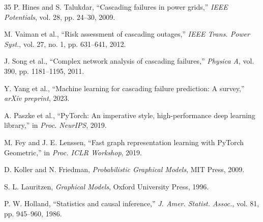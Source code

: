 \documentclass[journal,12pt,onecolumn]{IEEEtran}
\begin{document}
\begin{thebibliography}{35}
P. Hines and S. Talukdar, ``Cascading failures in power grids,'' \emph{IEEE Potentials}, vol. 28, pp. 24--30, 2009.

M. Vaiman et al., ``Risk assessment of cascading outages,'' \emph{IEEE Trans. Power Syst.}, vol. 27, no. 1, pp. 631--641, 2012.

J. Song et al., ``Complex network analysis of cascading failures,'' \emph{Physica A}, vol. 390, pp. 1181--1195, 2011.

Y. Yang et al., ``Machine learning for cascading failure prediction: A survey,'' \emph{arXiv preprint}, 2023.

A. Paszke et al., ``PyTorch: An imperative style, high-performance deep learning library,'' in \emph{Proc. NeurIPS}, 2019.

M. Fey and J. E. Lenssen, ``Fast graph representation learning with PyTorch Geometric,'' in \emph{Proc. ICLR Workshop}, 2019.

D. Koller and N. Friedman, \emph{Probabilistic Graphical Models}, MIT Press, 2009.

S. L. Lauritzen, \emph{Graphical Models}, Oxford University Press, 1996.

P. W. Holland, ``Statistics and causal inference,'' \emph{J. Amer. Statist. Assoc.}, vol. 81, pp. 945--960, 1986.

\end{thebibliography}
\end{document}
